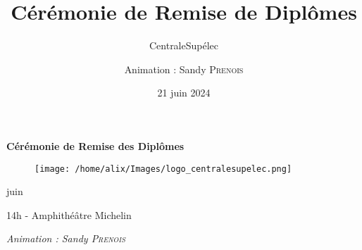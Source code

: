\documentclass{beamer}
\title[Cérémonie de Remise de Diplômes - 21 juin 2024]{Cérémonie de Remise de Diplômes}
\subtitle{CentraleSupélec }
\author{Animation : Sandy \textsc{Prenois}}
\institute{14h - Amphithéâtre Michelin}
\date{21 juin 2024}
\begin{document}

\begin{frame}[plain]
  \begin{center}
    \vspace*{0.5cm}
    {\Large \textbf{Cérémonie de Remise des Diplômes}} \\
    \vspace*{0.3cm}
    {\large 
    \begin{figure}
      \texttt{[image: /home/alix/Images/logo\_centralesupelec.png]}
    \end{figure}
    
    \vspace*{0.5cm}
     juin  \\
    }
    
    \vspace*{0.3cm}
    14h - Amphithéâtre Michelin \\
    \vspace*{0.7cm}
    
    \textit{ Animation : Sandy \textsc{Prenois}}
  \end{center}

\end{frame}


\end{document}
